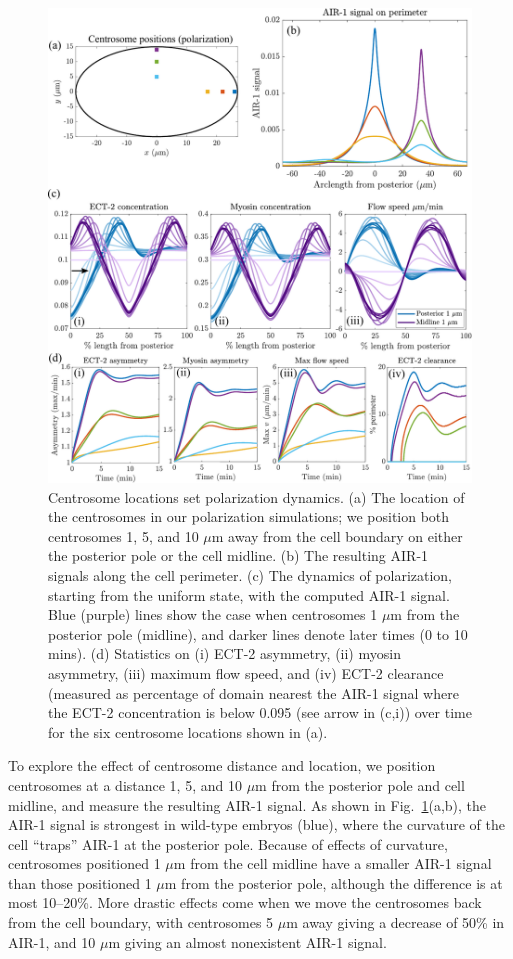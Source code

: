 \documentclass[11pt]{article}
\begin{document}
\begin{figure}
\centering
\includegraphics[width=\textwidth]{Glotzer/Fig5/Fig5-crop.pdf}
\caption{\label{fig:PolLoc}Centrosome locations set polarization dynamics. (a) The location of the centrosomes in our polarization simulations; we position both centrosomes 1, 5, and 10 $\mu$m away from the cell boundary on either the posterior pole or the cell midline. (b) The resulting AIR-1 signals along the cell perimeter. (c) The dynamics of polarization, starting from the uniform state, with the computed AIR-1 signal. Blue (purple) lines show the case when centrosomes 1 $\mu$m from the posterior pole (midline), and darker lines denote later times (0 to 10 mins). (d) Statistics on (i) ECT-2 asymmetry, (ii) myosin asymmetry, (iii) maximum flow speed, and (iv) ECT-2 clearance (measured as percentage of domain nearest the AIR-1 signal where the ECT-2 concentration is below 0.095 (see arrow in (c,i)) over time for the six centrosome locations shown in (a).}
\end{figure}

To explore the effect of centrosome distance and location, we position centrosomes at a distance 1, 5, and 10 $\mu$m from the posterior pole and cell midline, and measure the resulting AIR-1 signal. As shown in Fig.\ \ref{fig:PolLoc}(a,b), the AIR-1 signal is strongest in wild-type embryos (blue), where the curvature of the cell ``traps'' AIR-1 at the posterior pole. Because of effects of curvature, centrosomes positioned 1 $\mu$m from the cell midline have a smaller AIR-1 signal than those positioned 1 $\mu$m from the posterior pole, although the difference is at most 10--20\%. More drastic effects come when we move the centrosomes back from the cell boundary, with centrosomes 5 $\mu$m away giving a decrease of 50\% in AIR-1, and 10 $\mu$m giving an almost nonexistent AIR-1 signal.
\end{document}
